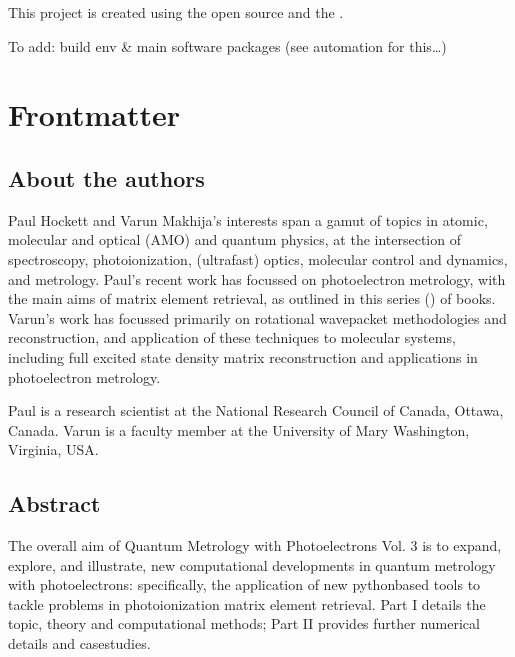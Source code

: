 \documentclass[letterpaper,table,10pt,english]{jupyterBook}
\begin{document}
\begin{DUlineblock}{0em}
\item[] 
\end{DUlineblock}

\sphinxAtStartPar
This project is created using the open source  and the .

\sphinxAtStartPar
To add: build env \& main software packages (see automation for this…)

\sphinxAtStartPar
{}

\sphinxstepscope


\part{Frontmatter}

\sphinxstepscope


\chapter{About the authors}
\label{\detokenize{frontmatter/about_the_authors:about-the-authors}}\label{\detokenize{frontmatter/about_the_authors::doc}}
\sphinxAtStartPar
Paul Hockett and Varun Makhija’s interests span a gamut of topics in atomic, molecular and optical (AMO) and quantum physics, at the intersection of spectroscopy, photoionization, (ultrafast) optics, molecular control and dynamics, and metrology. Paul’s recent work has focussed on photoelectron metrology, with the main aims of matrix element retrieval, as outlined in this series () of books. Varun’s work has focussed primarily on rotational wavepacket methodologies and reconstruction, and application of these techniques to molecular systems, including full excited state density matrix reconstruction and applications in photoelectron metrology.

\sphinxAtStartPar
Paul is a research scientist at the National Research Council of Canada, Ottawa, Canada. Varun is a faculty member at the University of Mary Washington, Virginia, USA.

\sphinxstepscope


\chapter{Abstract}
\label{\detokenize{frontmatter/abstract:abstract}}\label{\detokenize{frontmatter/abstract::doc}}
\sphinxAtStartPar
The overall aim of Quantum Metrology with Photoelectrons Vol. 3 is to expand, explore, and illustrate, new computational developments in quantum metrology with photoelectrons: specifically, the application of new python\sphinxhyphen{}based tools to tackle problems in photoionization matrix element retrieval. Part I details the topic, theory and computational methods; Part II provides further numerical details and case\sphinxhyphen{}studies.
\end{document}
